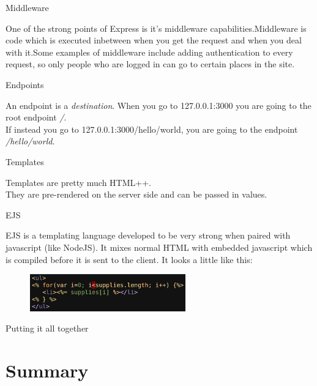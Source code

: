 \documentclass{beamer}
\begin{document}
\begin{frame}{Middleware}

One of the strong points of Express is it's middleware capabilities.\pause Middleware is code which is executed inbetween when you get the request and when you deal with it.\pause Some examples of middleware include adding authentication to every request, so only people who are logged in can go to certain places in the site.

\end{frame}

\begin{frame}{Endpoints}

An endpoint is a \textit{destination}. When you go to 127.0.0.1:3000 you are going to the root endpoint \textit{/}.\pause \\
If instead you go to 127.0.0.1:3000/hello/world, you are going to the endpoint \textit{/hello/world}.

\end{frame}

\begin{frame}{Templates}

Templates are pretty much HTML++.\\ \pause
They are pre-rendered on the server side and can be passed in values.

\end{frame}

\begin{frame}{EJS}

EJS is a templating language developed to be very strong when paired with javascript (like NodeJS). It mixes normal HTML with embedded javascript which is compiled before it is sent to the client. It looks a little like this:

\begin{figure}[h]
\includegraphics[width=0.6\textwidth]{ejs}
\end{figure}


\end{frame}

\begin{frame}{Putting it all together}

\end{frame}

\section{Summary}
\end{document}
